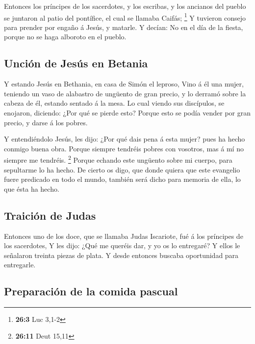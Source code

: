  Entonces los príncipes de los sacerdotes, y los escribas, y
los ancianos del pueblo se juntaron al patio del pontífice, el cual se
llamaba Caifás; \footnote{\textbf{26:3} Luc 3,1-2}  Y
tuvieron consejo para prender por engaño á Jesús, y matarle.
 Y decían: No en el día de la fiesta, porque no se haga
alboroto en el pueblo.

\hypertarget{unciuxf3n-de-jesuxfas-en-betania}{%
\subsection{Unción de Jesús en
Betania}\label{unciuxf3n-de-jesuxfas-en-betania}}

 Y estando Jesús en Bethania, en casa de Simón el leproso,
 Vino á él una mujer, teniendo un vaso de alabastro de
ungüento de gran precio, y lo derramó sobre la cabeza de él, estando
sentado á la mesa.  Lo cual viendo sus discípulos, se
enojaron, diciendo: ¿Por qué se pierde esto?  Porque esto se
podía vender por gran precio, y darse á los pobres.

 Y entendiéndolo Jesús, les dijo: ¿Por qué dais pena á esta
mujer? pues ha hecho conmigo buena obra.  Porque siempre
tendréis pobres con vosotros, mas á mí no siempre me tendréis.
\footnote{\textbf{26:11} Deut 15,11}  Porque echando este
ungüento sobre mi cuerpo, para sepultarme lo ha hecho.  De
cierto os digo, que donde quiera que este evangelio fuere predicado en
todo el mundo, también será dicho para memoria de ella, lo que ésta ha
hecho.

\hypertarget{traiciuxf3n-de-judas}{%
\subsection{Traición de Judas}\label{traiciuxf3n-de-judas}}

 Entonces uno de los doce, que se llamaba Judas Iscariote,
fué á los príncipes de los sacerdotes,  Y les dijo: ¿Qué me
queréis dar, y yo os lo entregaré? Y ellos le señalaron treinta piezas
de plata.  Y desde entonces buscaba oportunidad para
entregarle.

\hypertarget{preparaciuxf3n-de-la-comida-pascual}{%
\subsection{Preparación de la comida
pascual}\label{preparaciuxf3n-de-la-comida-pascual}}

